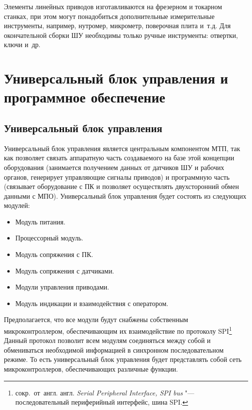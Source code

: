 Элементы линейных приводов изготавливаются на фрезерном и токарном станках, при этом могут понадобиться дополнительные измерительные инструменты, например, нутромер, микрометр, поверочная плита и~т.\:д. Для окончательной сборки ШУ необходимы только ручные инструменты: отвертки, ключи и~др.

\section{Универсальный блок управления и программное обеспечение}

\subsection{Универсальный блок управления}

Универсальный блок управления является центральным компонентом \foreignlanguage{english}{МТП}, так как позволяет связать аппаратную часть создаваемого на базе этой концепции оборудования (занимается получением данных от датчиков ШУ и рабочих органов, генерирует управляющие сигналы приводов) и программную часть (связывает оборудование с ПК и позволяет осуществлять двухсторонний обмен данными с \foreignlanguage{english}{МПО}). Универсальный блок управления будет состоять из следующих модулей:

\begin{itemize}
	\item Модуль питания.
	
	\item Процессорный модуль.
	
	\item Модуль сопряжения с ПК.
	
	\item Модуль сопряжения с датчиками.
	
	\item Модули управления приводами.
	
	\item Модуль индикации и взаимодействия с оператором.
\end{itemize}

Предполагается, что все модули будут снабжены собственным микроконтроллером, обеспечивающим их взаимодействие по протоколу \foreignlanguage{english}{SPI}\footnote{сокр.~от~англ. англ. \textit{Serial Peripheral Interface, SPI bus} "--- последовательный периферийный интерфейс, шина SPI.} Данный протокол позволит всем модулям соединяться между собой и обмениваться необходимой информацией в синхронном последовательном режиме. То есть универсальный блок управления будет представлять собой сеть микроконтроллеров, обеспечивающих различные функции.

